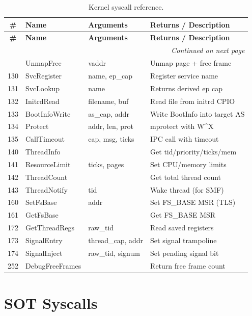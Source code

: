 \documentclass[11pt,a4paper,twoside]{report}
\theoremstyle{definition}
\begin{document}
\begin{longtable}{c l p{3.5cm} p{5cm}}
\caption{Kernel syscall reference.} \label{tab:kern-syscalls} \\
\toprule
\textbf{\#} & \textbf{Name} & \textbf{Arguments} & \textbf{Returns / Description} \\
\midrule
\endfirsthead
\toprule
\textbf{\#} & \textbf{Name} & \textbf{Arguments} & \textbf{Returns / Description} \\
\midrule
\endhead
\midrule
\multicolumn{4}{r}{\textit{Continued on next page}} \\
\endfoot
\bottomrule
\endlastfoot
24  & UnmapFree      & vaddr          & Unmap page + free frame \\
130 & SvcRegister    & name, ep\_cap   & Register service name \\
131 & SvcLookup      & name           & Returns derived ep cap \\
132 & InitrdRead     & filename, buf  & Read file from initrd CPIO \\
133 & BootInfoWrite  & as\_cap, addr   & Write BootInfo into target AS \\
134 & Protect        & addr, len, prot & mprotect with W\^{}X \\
135 & CallTimeout    & cap, msg, ticks & IPC call with timeout \\
140 & ThreadInfo     &                & Get tid/priority/ticks/mem \\
141 & ResourceLimit  & ticks, pages   & Set CPU/memory limits \\
142 & ThreadCount    &                & Get total thread count \\
143 & ThreadNotify   & tid            & Wake thread (for SMF) \\
160 & SetFsBase      & addr           & Set FS\_BASE MSR (TLS) \\
161 & GetFsBase      &                & Get FS\_BASE MSR \\
172 & GetThreadRegs  & raw\_tid        & Read saved registers \\
173 & SignalEntry    & thread\_cap, addr & Set signal trampoline \\
174 & SignalInject   & raw\_tid, signum & Set pending signal bit \\
252 & DebugFreeFrames &               & Return free frame count \\
\end{longtable}

\section{SOT Syscalls}
\end{document}
